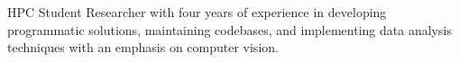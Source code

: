 
HPC Student Researcher with four years of experience in developing programmatic solutions, maintaining codebases, and implementing data analysis techniques with an emphasis on computer vision.

